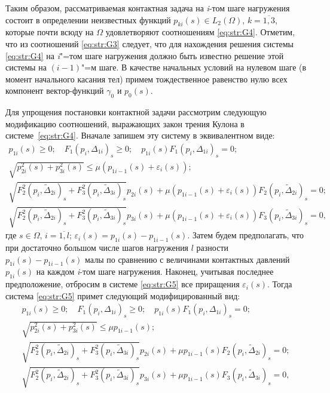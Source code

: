 Таким образом, рассматриваемая контактная задача на \textit{i}-том шаге нагружения состоит в определении неизвестных функций $p_{ki} (s)\in L_{2} (\Omega)$, $k=\overline{1 , 3}$, которые почти всюду на $\Omega $ удовлетворяют соотношениям \eqref{eq:str:G4}.
Отметим, что из соотношений \eqref{eq:str:G3} следует, что для нахождения решения системы \eqref{eq:str:G4} на  \textit{i}"=том шаге нагружения должно быть известно решение этой системы на  $(i-1)$"=м шаге.
 В качестве начальных условий на нулевом шаге (в момент начального касания тел) примем тождественное равенство нулю всех компонент вектор-функций $\gamma_{0} $ и $p_{0} (s)$.

Для упрощения постановки контактной задачи рассмотрим следующую модификацию соотношений, выражающих закон трения Кулона в системе~\eqref{eq:str:G4}.
Вначале запишем эту систему в эквивалентном виде: 
\begin{equation} 
\label{eq:str:G5} 
\begin{array}{l} 
p_{1i} (s)\ge 0; \quad  F_{1} \left(p_{i} ,\Delta _{1i} \right)_{s} \ge 0; \quad  p_{1i} (s)   F_{1} \left(p_{i} ,\Delta _{1i} \right)_{s} =0; \\ 
\sqrt{p_{2i}^{2} (s)+p_{3i}^{2} (s)} \le \mu  \left(p_{1i-1} (s)+\varepsilon _{i} (s)\right); 
\\
\sqrt{F_{2}^{2} (p_{i} ,\tilde{\Delta }_{2i} )_{s} +F_{3}^{2} (p_{i} ,\tilde{\Delta }_{3i} )_{s} }  p_{2i} (s)+\mu  \left(p_{1i-1} (s)+\varepsilon _{i} (s)\right) F_{2}  (p_{i} ,\tilde{\Delta }_{2i} )_{s} =0; 
\\
\sqrt{F_{2}^{2} (p_{i} ,\tilde{\Delta }_{2i} )_{s} +F_{3}^{2} (p_{i} ,\tilde{\Delta }_{3i} )_{s} }  p_{3i} (s)+\mu \left(p_{1i-1} (s)+\varepsilon _{i} (s)\right) F_{3}  (p_{i} ,\tilde{\Delta }_{3i} )_{s} =0, 
\end{array}
 \end{equation} 
где $s\in \Omega$, $i=\overline{1, l}$; $\varepsilon _{i} (s)=p_{1i} (s)-p_{1i-1} (s)$.
Затем будем предполагать, что при достаточно большом числе шагов нагружения $l$ разности $p_{1i} (s)-p_{1i-1} (s)$ малы по сравнению с величинами контактных давлений $p_{1i} (s)$ на каждом \textit{i}-том шаге нагружения.
Наконец, учитывая последнее предположение, отбросим в системе \eqref{eq:str:G5} все приращения $\varepsilon _{i} (s)$.
Тогда система \eqref{eq:str:G5} примет следующий модифицированный вид:
\begin{equation} \label{eq:str:G6} 
\begin{array}{l} 
p_{1i} (s)\ge 0; \quad  F_{1} \left(p_{i} ,\Delta _{1i} \right)_{s} \ge 0; \quad  p_{1i} (s) F_{1} \left(p_{i} ,\Delta _{1i} \right)_{s} =0; 
\\ 
\sqrt{p_{2i}^{2} (s)+p_{3i}^{2} (s)} \le \mu  p_{1i-1} (s); 
\\ 
\sqrt{F_{2}^{2} (p_{i} ,\tilde{\Delta }_{2i} )_{s} +F_{3}^{2} (p_{i} ,\tilde{\Delta }_{3i} )_{s} }  p_{2i} (s)+\mu  p_{1i-1} (s) F_{2}  (p_{i} ,\tilde{\Delta }_{2i} )_{s} =0; 
\\ 
\sqrt{F_{2}^{2} (p_{i} ,\tilde{\Delta }_{2i} )_{s} +F_{3}^{2} (p_{i} ,\tilde{\Delta }_{3i} )_{s} }  p_{3i} (s)+\mu  p_{1i-1} (s) F_{3}  (p_{i} ,\tilde{\Delta }_{3i} )_{s} =0,
\end{array}
 \end{equation} 
